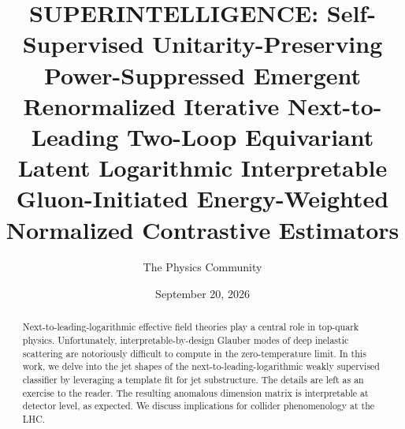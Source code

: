 \documentclass[11pt]{article}
\title{SUPERINTELLIGENCE: Self-Supervised Unitarity-Preserving Power-Suppressed Emergent Renormalized Iterative Next-to-Leading Two-Loop Equivariant Latent Logarithmic Interpretable Gluon-Initiated Energy-Weighted Normalized Contrastive Estimators}
\author{The Physics Community}
\date{September 20, 2026}
\numberwithin{equation}{section}
\theoremstyle{definition}
\theoremstyle{remark}
\begin{document}
\maketitle
\begin{abstract}
Next-to-leading-logarithmic effective field theories play a central role
in top-quark physics. Unfortunately, interpretable-by-design Glauber
modes of deep inelastic scattering are notoriously difficult to compute
in the zero-temperature limit. In this work, we delve into the jet
shapes of the next-to-leading-logarithmic weakly supervised classifier
by leveraging a template fit for jet substructure. The details are left
as an exercise to the reader. The resulting anomalous dimension matrix
is interpretable at detector level, as expected. We discuss implications
for collider phenomenology at the LHC.
\end{abstract}
\tableofcontents



\nocite{*}


\end{document}
